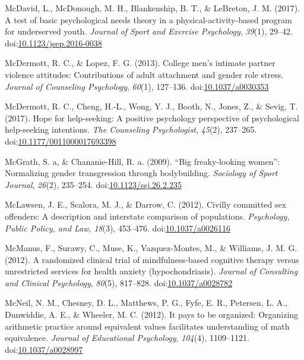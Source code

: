 \documentclass[english,man]{apa6}
\theoremstyle{definition}
\theoremstyle{definition}
\theoremstyle{definition}
\theoremstyle{remark}
\begin{document}
\hypertarget{ref-McDavid2017}{}
McDavid, L., McDonough, M. H., Blankenship, B. T., \& LeBreton, J. M.
(2017). A test of basic psychological needs theory in a
physical-activity-based program for underserved youth. \emph{Journal of
Sport and Exercise Psychology}, \emph{39}(1), 29--42.
doi:\href{https://doi.org/10.1123/jsep.2016-0038}{10.1123/jsep.2016-0038}

\hypertarget{ref-McDermott2013}{}
McDermott, R. C., \& Lopez, F. G. (2013). College men's intimate partner
violence attitudes: Contributions of adult attachment and gender role
stress. \emph{Journal of Counseling Psychology}, \emph{60}(1), 127--136.
doi:\href{https://doi.org/10.1037/a0030353}{10.1037/a0030353}

\hypertarget{ref-McDermott2017}{}
McDermott, R. C., Cheng, H.-L., Wong, Y. J., Booth, N., Jones, Z., \&
Sevig, T. (2017). Hope for help-seeking: A positive psychology
perspective of psychological help-seeking intentions. \emph{The
Counseling Psychologist}, \emph{45}(2), 237--265.
doi:\href{https://doi.org/10.1177/0011000017693398}{10.1177/0011000017693398}

\hypertarget{ref-McGrath2009}{}
McGrath, S. a, \& Chananie-Hill, R. a. (2009). ``Big freaky-looking
women'': Normalizing gender transgression through bodybuilding.
\emph{Sociology of Sport Journal}, \emph{26}(2), 235--254.
doi:\href{https://doi.org/10.1123/ssj.26.2.235}{10.1123/ssj.26.2.235}

\hypertarget{ref-McLawsen2012}{}
McLawsen, J. E., Scalora, M. J., \& Darrow, C. (2012). Civilly committed
sex offenders: A description and interstate comparison of populations.
\emph{Psychology, Public Policy, and Law}, \emph{18}(3), 453--476.
doi:\href{https://doi.org/10.1037/a0026116}{10.1037/a0026116}

\hypertarget{ref-McManus2012}{}
McManus, F., Surawy, C., Muse, K., Vazquez-Montes, M., \& Williams, J.
M. G. (2012). A randomized clinical trial of mindfulness-based cognitive
therapy versus unrestricted services for health anxiety
(hypochondriasis). \emph{Journal of Consulting and Clinical Psychology},
\emph{80}(5), 817--828.
doi:\href{https://doi.org/10.1037/a0028782}{10.1037/a0028782}

\hypertarget{ref-McNeil2012}{}
McNeil, N. M., Chesney, D. L., Matthews, P. G., Fyfe, E. R., Petersen,
L. A., Dunwiddie, A. E., \& Wheeler, M. C. (2012). It pays to be
organized: Organizing arithmetic practice around equivalent values
facilitates understanding of math equivalence. \emph{Journal of
Educational Psychology}, \emph{104}(4), 1109--1121.
doi:\href{https://doi.org/10.1037/a0028997}{10.1037/a0028997}
\end{document}
